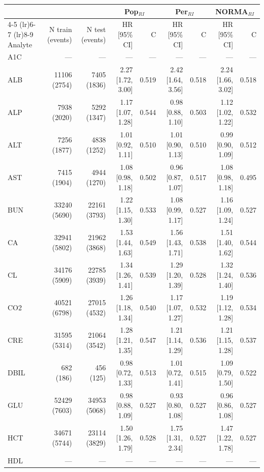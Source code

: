 \begin{table}[ht]
\centering
\footnotesize
\begin{tabular}{lrrrrrrrr}
\toprule
 & &  & \multicolumn{2}{c}{Pop$_{RI}$} & \multicolumn{2}{c}{Per$_{RI}$} & \multicolumn{2}{c}{NORMA$_{RI}$} \\
\cmidrule(lr){4-5} \cmidrule(lr){6-7} \cmidrule(lr){8-9}
Analyte & N train (events) & N test (events) & HR [95\% CI] & C & HR [95\% CI] & C & HR [95\% CI] & C \\
\midrule
A1C & --- & --- & --- & --- & --- & --- & --- & --- \\
ALB & 11106 (2754) & 7405 (1836) & 2.27 [1.72, 3.00] & 0.519 & 2.42 [1.64, 3.56] & 0.518 & 2.24 [1.66, 3.02] & 0.518 \\
ALP & 7938 (2020) & 5292 (1347) & 1.17 [1.07, 1.28] & 0.544 & 0.98 [0.88, 1.10] & 0.503 & 1.12 [1.02, 1.22] & 0.532 \\
ALT & 7256 (1877) & 4838 (1252) & 1.01 [0.92, 1.11] & 0.510 & 1.01 [0.90, 1.13] & 0.510 & 0.99 [0.90, 1.09] & 0.512 \\
AST & 7415 (1904) & 4944 (1270) & 1.08 [0.98, 1.18] & 0.502 & 0.96 [0.87, 1.07] & 0.517 & 1.08 [0.98, 1.18] & 0.495 \\
BUN & 33240 (5690) & 22161 (3793) & 1.22 [1.15, 1.30] & 0.533 & 1.08 [0.99, 1.17] & 0.527 & 1.16 [1.09, 1.24] & 0.527 \\
CA & 32941 (5802) & 21962 (3868) & 1.53 [1.44, 1.63] & 0.549 & 1.56 [1.43, 1.71] & 0.538 & 1.51 [1.40, 1.62] & 0.544 \\
CL & 34176 (5909) & 22785 (3939) & 1.34 [1.26, 1.41] & 0.539 & 1.29 [1.20, 1.39] & 0.528 & 1.32 [1.24, 1.40] & 0.536 \\
CO2 & 40521 (6798) & 27015 (4532) & 1.26 [1.18, 1.34] & 0.540 & 1.17 [1.07, 1.27] & 0.532 & 1.19 [1.12, 1.28] & 0.534 \\
CRE & 31595 (5314) & 21064 (3542) & 1.28 [1.21, 1.35] & 0.547 & 1.21 [1.14, 1.29] & 0.536 & 1.21 [1.15, 1.28] & 0.537 \\
DBIL & 682 (186) & 456 (125) & 0.98 [0.72, 1.33] & 0.513 & 1.01 [0.72, 1.41] & 0.515 & 1.09 [0.79, 1.50] & 0.522 \\
GLU & 52429 (7603) & 34953 (5068) & 0.98 [0.88, 1.09] & 0.527 & 0.93 [0.80, 1.08] & 0.527 & 0.96 [0.86, 1.08] & 0.527 \\
HCT & 34671 (5744) & 23114 (3829) & 1.50 [1.26, 1.79] & 0.528 & 1.75 [1.31, 2.34] & 0.527 & 1.47 [1.22, 1.78] & 0.527 \\
HDL & --- & --- & --- & --- & --- & --- & --- & --- \\

\end{tabular}
\end{table}

